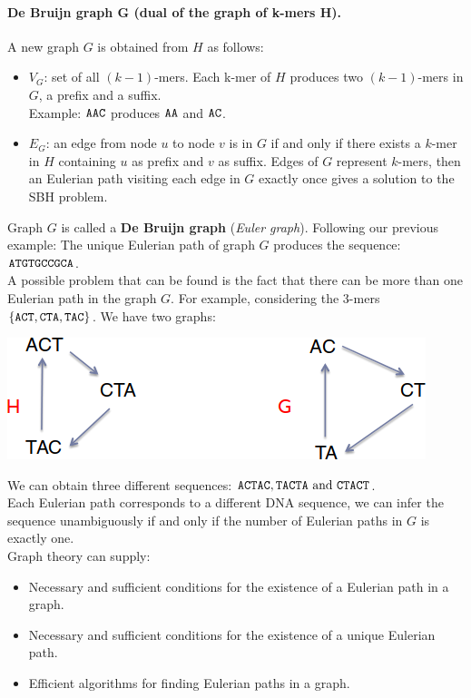 \paragraph*{De Bruijn graph G (dual of the graph of k-mers H).} A new graph $G$ is obtained from $H$ as follows:
\begin{itemize}
	\item $V_G$: set of all $(k-1)$-mers. Each k-mer of $H$ produces two $(k-1)$-mers in $G$, a prefix and a suffix.\\
	Example: $\verb|AAC|$ produces $\verb|AA|$ and $\verb|AC|$.
	\item $E_G$: an edge from node $u$ to node $v$ is in $G$ if and only if there exists a $k$-mer in $H$ containing $u$ as prefix and $v$ as suffix. Edges of $G$ represent $k$-mers, then an Eulerian path visiting each edge in $G$ exactly once gives a solution to the SBH problem.
\end{itemize}
Graph $G$ is called a \textbf{De Bruijn graph} (\textit{Euler graph}). Following our previous example:
The unique Eulerian path of graph $G$ produces the sequence: $\verb|ATGTGCCGCA|$.\\
A possible problem that can be found is the fact that there can be more than one Eulerian path in the graph $G$. For example, considering the $3$-mers $\{\verb|ACT|, \verb|CTA|, \verb|TAC|\}$. We have two graphs:
\begin{center}
	\includegraphics[width=0.7\columnwidth]{img/DeBruijn2}
\end{center} 
We can obtain three different sequences: $\verb|ACTAC|, \verb|TACTA| \text{ and } \verb|CTACT|$.\\
Each Eulerian path corresponds to a different DNA sequence, we can infer the sequence unambiguously if and only if the number of Eulerian paths in $G$ is exactly one.\\
Graph theory can supply:
\begin{itemize}
	\item Necessary and sufficient conditions for the existence of a Eulerian path in a graph.
	\item Necessary and sufficient conditions for the existence of a unique Eulerian path.
	\item Efficient algorithms for finding Eulerian paths in a graph.
\end{itemize}
